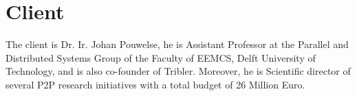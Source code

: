\section{Client}
The client is Dr. Ir. Johan Pouwelse, he is Assistant Professor at the Parallel and Distributed Systems Group of the Faculty of EEMCS, Delft University of Technology, and is also co-founder of Tribler. Moreover, he is Scientific director of several P2P research initiatives with a total budget of 26 Million Euro.